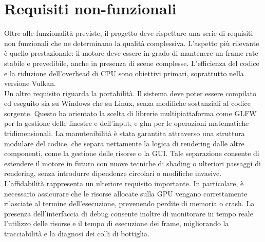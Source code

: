 \documentclass[12pt,a4paper,openright,twoside]{book}
\begin{document}
\section{Requisiti non-funzionali}
Oltre alle funzionalità previste, il progetto deve rispettare una serie di requisiti non funzionali che ne
determinano la qualità complessiva. L'aspetto più rilevante è quello prestazionale: il motore deve essere in grado
di mantenere un frame rate stabile e prevedibile, anche in presenza di scene complesse. L'efficienza del codice e
la riduzione dell'overhead di CPU sono obiettivi primari, soprattutto nella versione Vulkan. \\
Un altro requisito riguarda la portabilità. Il sistema deve poter essere compilato ed eseguito sia su Windows che su
Linux, senza modifiche sostanziali al codice sorgente. Questo ha orientato la scelta di librerie multipiattaforma
come GLFW per la gestione delle finestre e dell'input, e glm per le operazioni matematiche tridimensionali.
La manutenibilità è stata garantita attraverso una struttura modulare del codice, che separa nettamente la logica di
rendering dalle altre componenti, come la gestione delle risorse o la GUI. Tale separazione consente di estendere il
motore in futuro con nuove tecniche di shading o ulteriori passaggi di rendering, senza introdurre dipendenze
circolari o modifiche invasive. \\
L'affidabilità rappresenta un ulteriore requisito importante. In particolare, è necessario assicurare che le risorse
allocate sulla GPU vengano correttamente rilasciate al termine dell'esecuzione, prevenendo perdite di memoria o crash.
La presenza dell'interfaccia di debug consente inoltre di monitorare in tempo reale l'utilizzo delle risorse e il
tempo di esecuzione dei frame, migliorando la tracciabilità e la diagnosi dei colli di bottiglia.
\end{document}
